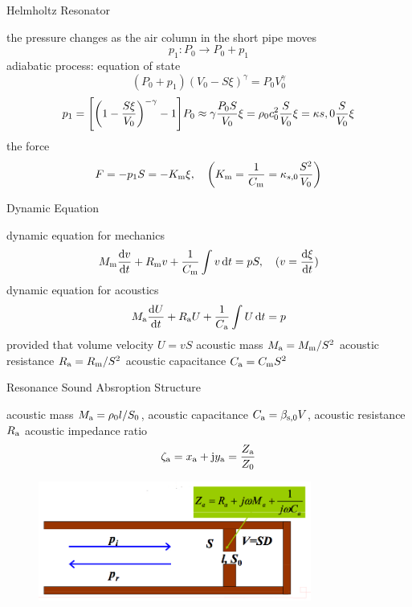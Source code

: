 \documentclass[9pt,mathserif]{beamer}
\begin{document}
\begin{frame}{Helmholtz Resonator}
	\begin{outline}
		\1 the pressure changes as the air column in the short pipe moves
		$$p_1: P_0 \to P_0+p_1$$
		\1 adiabatic process: equation of state
		$$(P_0+p_1)(V_0-S\xi)^\gamma = P_0V_0^\gamma$$
		$$p_1 = \qty[\qty(1-\frac{S\xi}{V_0})^{-\gamma} -1]P_0
		\approx \gamma \frac{P_0S}{V_0}\xi 
		=\rho_0 c_0^2 \frac{S}{V_0}\xi = \kappa{s,0} \frac{S}{V_0}\xi
		$$
		\1 the force
		$$F = -p_1 S = -K\st{m} \xi\qc \qty(K\st{m} = \frac{1}{C\st{m}} = 
		\kappa_{s,0} \frac{S^2}{V_0})$$
	\end{outline}
\end{frame}

\begin{frame}{Dynamic Equation}
	\begin{outline}
		\1  dynamic equation for mechanics
		$$M\st{m}\dv{v}{t} +R\st{m} v + \frac{1}{C\st{m}}
		\int v\dd{t} = pS\qc(v=\dv{\xi}{t})$$
		\1 dynamic equation for acoustics
		$$M_\text{a}\dv{U}{t} +R_\text{a} U +\frac{1}{C_\text{a}} \int U\dd{t}=p$$
		\1 provided that
			\2 volume velocity $U=vS$
			\2 acoustic mass $M_\text{a}=M_\text{m}/S^2$
			\2 acoustic resistance $R_\text{a}=R_\text{m}/S^2$
			\2 acoustic capacitance $C_\text{a}=C_\text{m}S^2$
	\end{outline}
\end{frame}

\begin{frame}{Resonance Sound Absroption Structure}
	\begin{outline}
		\1 acoustic mass $M_\text{a} = \rho_0 l /S_0$, acoustic capacitance
		$C_\text{a} =  \beta_\text{s,0} V$, acoustic resistance $R_\text{a}$
		\1 acoustic impedance ratio
		$$\zeta_\text{a}=x_\text{a}+\mathrm{j} y_\text{a} = \frac{Z_\text{a}}{Z_0}$$
	\end{outline}
	\begin{figure}
		\centering
		\includegraphics[width=0.8\textwidth]{img/duct/resonanceAbsorptionStructure.jpg}
	\end{figure}
\end{frame}
\end{document}
